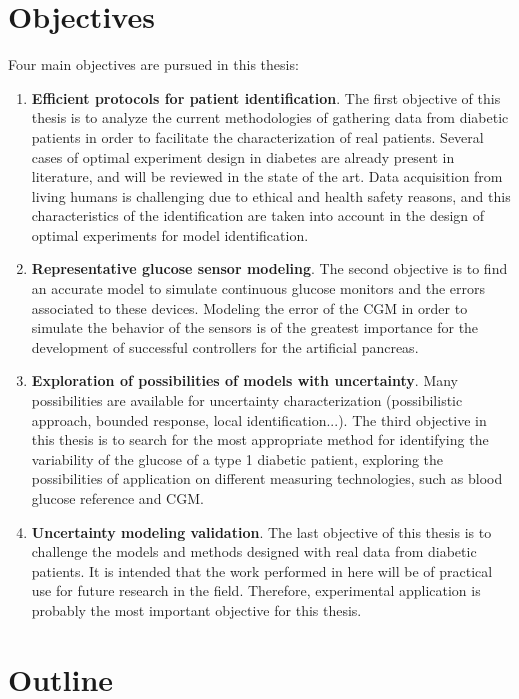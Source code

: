 \section*{Objectives}
\label{sec:Objectives}

Four main objectives are pursued in this thesis:

\begin{enumerate}
	\item \textbf{Efficient protocols for patient identification}. The first objective of this thesis is to analyze the current methodologies of gathering data from diabetic patients in order to facilitate the characterization of real patients. Several cases of optimal experiment design in diabetes are already present in literature, and will be reviewed in the state of the art. Data acquisition from living humans is challenging due to ethical and health safety reasons, and this characteristics of the identification are taken into account in the design of optimal experiments for model identification.
	\item \textbf{Representative glucose sensor modeling}. The second objective is to find an accurate model to simulate continuous glucose monitors and the errors associated to these devices. Modeling the error of the CGM in order to simulate the behavior of the sensors is of the greatest importance for the development of successful controllers for the artificial pancreas.
	\item \textbf{Exploration of possibilities of models with uncertainty}. Many possibilities are available for uncertainty characterization (possibilistic approach, bounded response, local identification...). The third objective in this thesis is to search for the most appropriate method for identifying the variability of the glucose of a type 1 diabetic patient, exploring the possibilities of application on different measuring technologies, such as blood glucose reference and CGM.
	\item \textbf{Uncertainty modeling validation}. The last objective of this thesis is to challenge the models and methods designed with real data from diabetic patients. It is intended that the work performed in here will be of practical use for future research in the field. Therefore, experimental application is probably the most important objective for this thesis.
	
\end{enumerate}

\section*{Outline}
\label{sec:Outline}

